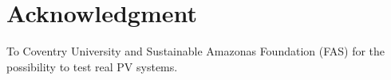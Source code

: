 \documentclass[journal]{IEEEtran}
\begin{document}


%





\section*{Acknowledgment}
To Coventry University and Sustainable Amazonas Foundation (FAS) for the possibility to test real PV systems.
\end{document}
